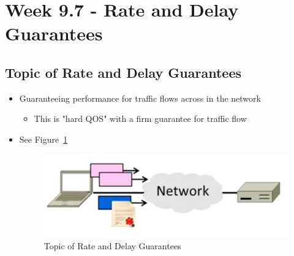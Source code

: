 \documentclass[12pt]{ctexart}   %
\begin{document}
\section{Week 9.7 - Rate and Delay Guarantees}	
	\subsection{Topic of Rate and Delay Guarantees}
	\begin{itemize}
		\item Guaranteeing performance for traffic flows across in the network
		\begin{itemize}
			\item This is "hard QOS" with a firm guarantee for traffic flow
		\end{itemize}
		\item See Figure~\ref{fig:9-7-1}
		  
		\begin{figure}[h!] %
		\centering
		\includegraphics[scale=0.7]{images/9-7-1}
		\caption{ Topic of Rate and Delay Guarantees }
		\label{fig:9-7-1}
		\end{figure}
	\end{itemize}
\end{document}
